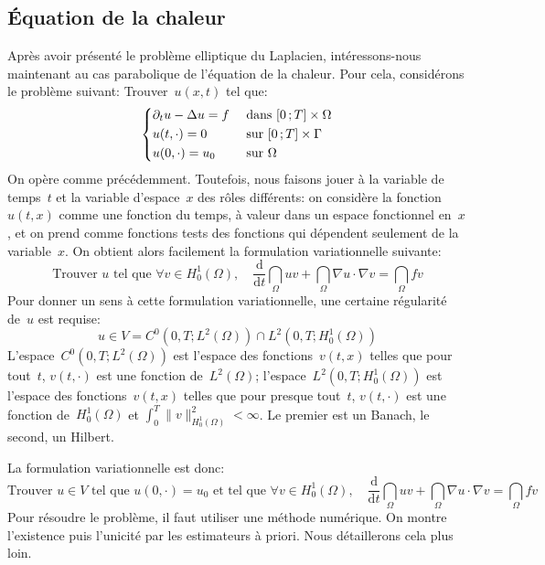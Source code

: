 \medskip
\subsection{Équation de la chaleur}
Après avoir présenté le problème elliptique du Laplacien, intéressons-nous maintenant au cas parabolique de l'équation de la chaleur. Pour cela, considérons le problème suivant:
Trouver~$u(x,t)$ tel que:
\begin{equation}
\left\{
\begin{aligned}
&\partial_t u -\Delta u = f &&\text{ dans } \mathopen{[}0\,;T\mathclose{]}\times\Omega\\
&u(t,\cdot) = 0 &&\text{ sur } \mathopen{[}0\,;T\mathclose{]}\times\Gamma\\
&u(0,\cdot)=u_0 &&\text{ sur } \Omega
\end{aligned}
\right.
\end{equation}
\medskip
On opère comme précédemment. Toutefois, nous faisons jouer à la variable de temps~$t$ et la variable d'espace~$x$ des rôles différents: on considère la fonction~$u(t, x)$ comme une fonction du temps, à valeur dans un espace fonctionnel en~$x$, et on prend comme fonctions tests des fonctions qui dépendent seulement de la variable~$x$. On obtient alors facilement la formulation variationnelle suivante:
\begin{equation}
\text{Trouver } u \text{ tel que } \forall v\in H^1_0(\Omega),\quad
\dfrac{\mathrm d}{\mathrm dt}\dint_\Omega uv+\dint_\Omega \nabla u\cdot\nabla v=\dint_\Omega fv
\end{equation}
Pour donner un sens à cette formulation variationnelle, une certaine régularité de~$u$ est requise:
\begin{equation}
u\in V = C^0\left(0,T;L^2(\Omega)\right)\cap L^2\left(0,T;H^1_0(\Omega)\right)
\end{equation}
L'espace~$C^0\left(0,T;L^2(\Omega)\right)$ est l'espace des fonctions~$v(t,x)$ telles que pour tout~$t$, $v(t,\cdot)$ est une fonction de~$L^2(\Omega)$; l'espace~$L^2\left(0,T;H^1_0(\Omega)\right)$ est l'espace des fonctions~$v(t,x)$ telles
que pour presque tout~$t$, $v(t,\cdot)$ est une fonction de~$H^1_0(\Omega)$ et $\int_0^T \|v\|^2_{H^1_0(\Omega)}<\infty$. Le premier est un Banach, le second, un Hilbert.

\medskip
La formulation variationnelle est donc:
\begin{equation}
\text{Trouver } u\in V \text{ tel que } u(0,\cdot)=u_0 \text{ et tel que } \forall v\in H^1_0(\Omega),\quad
\dfrac{\mathrm d}{\mathrm dt}\dint_\Omega uv+\dint_\Omega \nabla u\cdot\nabla v=\dint_\Omega fv
\end{equation}
\medskip
Pour résoudre le problème, il faut utiliser une méthode numérique. On montre l'existence puis l'unicité par les estimateurs à priori. Nous détaillerons cela plus loin.

